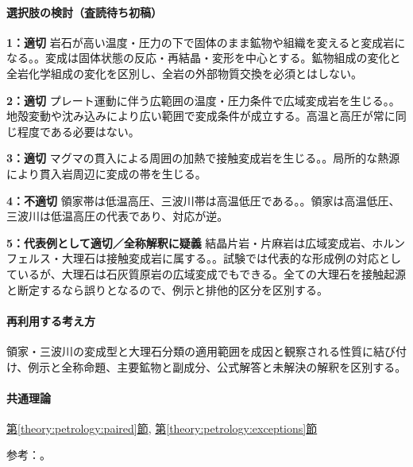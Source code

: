 \paragraph{選択肢の検討（査読待ち初稿）}\mbox{}\par

\noindent\textbf{1：適切} 岩石が高い温度・圧力の下で固体のまま鉱物や組織を変えると変成岩になる。。変成は固体状態の反応・再結晶・変形を中心とする。鉱物組成の変化と全岩化学組成の変化を区別し、全岩の外部物質交換を必須とはしない。\par

\noindent\textbf{2：適切} プレート運動に伴う広範囲の温度・圧力条件で広域変成岩を生じる。。地殻変動や沈み込みにより広い範囲で変成条件が成立する。高温と高圧が常に同じ程度である必要はない。\par

\noindent\textbf{3：適切} マグマの貫入による周囲の加熱で接触変成岩を生じる。。局所的な熱源により貫入岩周辺に変成の帯を生じる。\par

\noindent\textbf{4：不適切} 領家帯は低温高圧、三波川帯は高温低圧である。。領家は高温低圧、三波川は低温高圧の代表であり、対応が逆。\par

\noindent\textbf{5：代表例として適切／全称解釈に疑義} 結晶片岩・片麻岩は広域変成岩、ホルンフェルス・大理石は接触変成岩に属する。。試験では代表的な形成例の対応としているが、大理石は石灰質原岩の広域変成でもできる。全ての大理石を接触起源と断定するなら誤りとなるので、例示と排他的区分を区別する。\par

\paragraph{再利用する考え方} 領家・三波川の変成型と大理石分類の適用範囲を成因と観察される性質に結び付け、例示と全称命題、主要鉱物と副成分、公式解答と未解決の解釈を区別する。

\paragraph{共通理論} \hyperref[theory:petrology:paired]{第\ref*{theory:petrology:paired}節}, \hyperref[theory:petrology:exceptions]{第\ref*{theory:petrology:exceptions}節}

\par 参考：\cite{aist_awa2021,nelson_regional2011,nelson_contact2011}。

